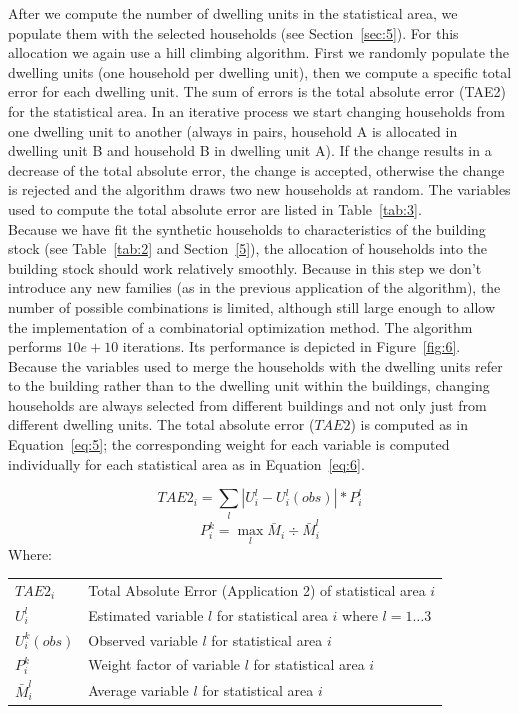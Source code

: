 \documentclass[11pt]{IJM-article}
\begin{document}
After we compute the number of dwelling units in the statistical area, we
populate them with the selected households (see Section~\ref{sec:5}). For this
allocation we again use a hill climbing algorithm.  First we randomly populate
the dwelling units (one household per dwelling unit), then we compute a
specific total error for each dwelling unit. The sum of errors is the total
absolute error (TAE2) for the statistical area. In an iterative process we
start changing households from one dwelling unit to another (always in pairs,
household A is allocated in dwelling unit B and household B in dwelling unit
A). If the change results in a decrease of the total absolute error, the change
is accepted, otherwise the change is rejected and the algorithm draws two new
households at random. The variables used to compute the total absolute error
are listed in Table~\ref{tab:3}.\\

Because we have fit the synthetic households to characteristics of the building
stock (see Table~\ref{tab:2} and Section~\ref{5}), the allocation of households
into the building stock should work relatively smoothly. Because in this step
we don't introduce any new families (as in the previous application of the
algorithm), the number of possible combinations is limited, although still
large enough to allow the implementation of a combinatorial optimization
method. The algorithm performs $10e+10$ iterations. Its performance is depicted
in Figure~\ref{fig:6}. Because the variables used to merge the households with
the dwelling units refer to the building rather than to the dwelling unit
within the buildings, changing households are always selected from different
buildings and not only just from different dwelling units. The total absolute
error ($TAE2$) is computed as in Equation~\ref{eq:5}; the corresponding weight
for each variable is computed individually for each statistical area as in
Equation~\ref{eq:6}.\\

\parbox{\textwidth}{ 
    \begin{equation} 
    \label{eq:5} 
        TAE2_i = \sum_{l} |U_i^{l} - U_i^{l}(obs)| * P^l_i 
    \end{equation} 
    \begin{equation}
    \label{eq:6} 
        P^k_i = \max_l{\bar{M}_i} \div \bar{M}^l_i 
    \end{equation}
    \noindent Where:\\ 
    \begin{tabular}{lp{15cm}} 
        $TAE2_i$ & Total Absolute Error (Application 2) of statistical
            area $i$ \\ 
        $U_i^{l}$ & Estimated variable $l$ for statistical area $i$ where 
            $l = 1 \dots 3$ \\ 
        $U_i^{k}(obs)$ & Observed variable $l$ for statistical area $i$ \\ 
        $P_i^k$ & Weight factor of variable $l$ for statistical area $i$\\ 
        $\bar{M}^l_i$ & Average variable $l$ for statistical area $i$ 
    \end{tabular} 
}\pb \pb
\end{document}
